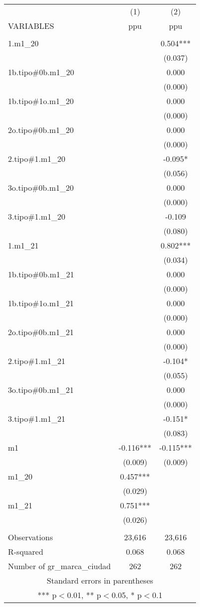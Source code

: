 \begin{tabular}{lcc} \hline
 & (1) & (2) \\
VARIABLES & ppu & ppu \\ \hline
 &  &  \\
1.m1\_20 &  & 0.504*** \\
 &  & (0.037) \\
1b.tipo\#0b.m1\_20 &  & 0.000 \\
 &  & (0.000) \\
1b.tipo\#1o.m1\_20 &  & 0.000 \\
 &  & (0.000) \\
2o.tipo\#0b.m1\_20 &  & 0.000 \\
 &  & (0.000) \\
2.tipo\#1.m1\_20 &  & -0.095* \\
 &  & (0.056) \\
3o.tipo\#0b.m1\_20 &  & 0.000 \\
 &  & (0.000) \\
3.tipo\#1.m1\_20 &  & -0.109 \\
 &  & (0.080) \\
1.m1\_21 &  & 0.802*** \\
 &  & (0.034) \\
1b.tipo\#0b.m1\_21 &  & 0.000 \\
 &  & (0.000) \\
1b.tipo\#1o.m1\_21 &  & 0.000 \\
 &  & (0.000) \\
2o.tipo\#0b.m1\_21 &  & 0.000 \\
 &  & (0.000) \\
2.tipo\#1.m1\_21 &  & -0.104* \\
 &  & (0.055) \\
3o.tipo\#0b.m1\_21 &  & 0.000 \\
 &  & (0.000) \\
3.tipo\#1.m1\_21 &  & -0.151* \\
 &  & (0.083) \\
m1 & -0.116*** & -0.115*** \\
 & (0.009) & (0.009) \\
m1\_20 & 0.457*** &  \\
 & (0.029) &  \\
m1\_21 & 0.751*** &  \\
 & (0.026) &  \\
 &  &  \\
Observations & 23,616 & 23,616 \\
R-squared & 0.068 & 0.068 \\
 Number of gr\_marca\_ciudad & 262 & 262 \\ \hline
\multicolumn{3}{c}{ Standard errors in parentheses} \\
\multicolumn{3}{c}{ *** p$<$0.01, ** p$<$0.05, * p$<$0.1} \\
\end{tabular}
